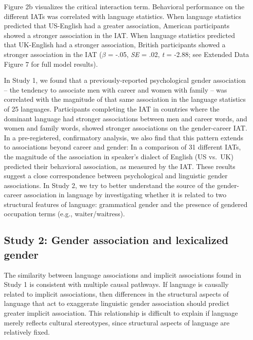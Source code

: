 \documentclass[11pt]{wlscirep}
\begin{document}
Figure 2b visualizes the critical interaction term. Behavioral performance on the different IATs was correlated with language statistics. When language statistics predicted that US-English had a greater association, American participants showed a stronger association in the IAT. When language statistics predicted that UK-English had a stronger association, British participants showed a stronger association in the IAT (\(\beta\) = -.05, \emph{SE} = .02, \emph{t} = -2.88; see Extended Data Figure 7 for full model results).

In Study 1, we found that a previously-reported psychological gender association – the tendency to associate men with career and women with family – was correlated with the magnitude of that same association in the language statistics of 25 languages. Participants completing the IAT in countries where the dominant language had stronger associations between men and career words, and women and family words, showed stronger associations on the gender-career IAT. In a pre-registered, confirmatory analysis, we also find that this pattern extends to associations beyond career and gender: In a comparison of 31 different IATs, the magnitude of the association in speaker’s dialect of English (US vs.\ UK) predicted their behavioral association, as measured by the IAT. These results suggest a close correspondence between psychological and linguistic gender associations. In Study 2, we try to
better understand the source of the gender-career association in language by investigating whether it is related to two structural features of
language: grammatical gender and the presence of gendered occupation
terms (e.g., waiter/waitress). 


\subsection*{Study 2: Gender association and lexicalized
gender}\label{study-2-gender-bias-and-lexicalized-gender}

The similarity between language associations and implicit associations found in Study 1 is consistent with multiple causal pathways. If language is causally related to implicit associations, then differences in the structural aspects of language that act to exaggerate linguistic gender association should predict greater implicit association. This relationship is difficult to explain if language merely reflects cultural stereotypes, since structural aspects of language are relatively fixed.
\end{document}
